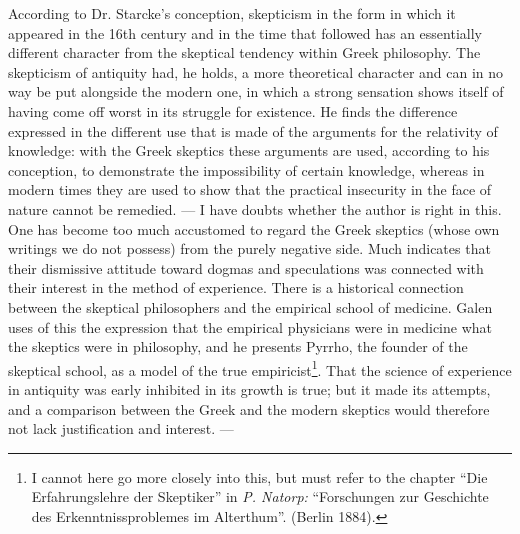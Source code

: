\documentclass[12pt,a4paper,openany]{book}
\newcommand{\opage}[1]{\marginnote{\footnotesize\textit{[#1]}}}
\begin{document}
According to Dr. Starcke's conception, skepticism in the
form in which it appeared in the 16th century and in
the time that followed has an essentially different character from
the skeptical tendency within Greek philosophy. The skepticism of antiquity
had, he holds, a more theoretical character
and can in no way be put alongside the modern one,
in which a strong sensation shows itself of having
come off worst in its struggle for existence. He finds the
difference expressed in the different use that is made
of the arguments for the relativity of knowledge: with the Greek
skeptics these arguments are used, according to his conception,
to demonstrate the impossibility of certain knowledge, whereas
in modern times they are used to show that the practical insecurity
in the face of nature cannot be remedied. --- I have doubts
whether the author is right in this. One has become too much
accustomed to regard the Greek skeptics (whose own
writings we do not possess) from the purely negative side. Much
indicates that their dismissive attitude toward dogmas
and speculations was connected with their interest in
the method of experience. There is a historical connection between the
skeptical philosophers and the empirical school of medicine. Galen uses
of this the expression that the empirical physicians were in medicine
what the skeptics were in philosophy, and he presents Pyrrho,
\opage{19}the founder of the skeptical school, as a model of
the true empiricist\footnote{I cannot here go more closely into this, but must refer to
the chapter ``Die Erfahrungslehre der Skeptiker'' in \emph{P. Natorp:}
``Forschungen zur Geschichte des Erkenntnissproblemes im Alterthum''.
(Berlin 1884).}. That the science of experience in antiquity
was early inhibited in its growth is true; but it made its
attempts, and a comparison between the Greek and the modern
skeptics would therefore not lack justification
and interest. ---
\end{document}
